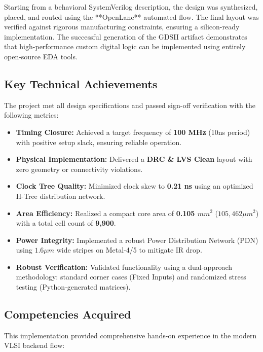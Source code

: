 \documentclass[12pt,a4paper]{article}
\begin{document}
Starting from a behavioral SystemVerilog description, the design was synthesized, placed, and routed using the **OpenLane** automated flow. The final layout was verified against rigorous manufacturing constraints, ensuring a silicon-ready implementation. The successful generation of the GDSII artifact demonstrates that high-performance custom digital logic can be implemented using entirely open-source EDA tools.

\subsection{Key Technical Achievements}

The project met all design specifications and passed sign-off verification with the following metrics:

\begin{itemize}
    \item \textbf{Timing Closure:} Achieved a target frequency of \textbf{100 MHz} (10ns period) with positive setup slack, ensuring reliable operation.
    \item \textbf{Physical Implementation:} Delivered a \textbf{DRC \& LVS Clean} layout with zero geometry or connectivity violations.
    \item \textbf{Clock Tree Quality:} Minimized clock skew to \textbf{0.21 ns} using an optimized H-Tree distribution network.
    \item \textbf{Area Efficiency:} Realized a compact core area of \textbf{0.105 $mm^2$} ($105,462 \mu m^2$) with a total cell count of \textbf{9,900}.
    \item \textbf{Power Integrity:} Implemented a robust Power Distribution Network (PDN) using $1.6 \mu m$ wide stripes on Metal-4/5 to mitigate IR drop.
    \item \textbf{Robust Verification:} Validated functionality using a dual-approach methodology: standard corner cases (Fixed Inputs) and randomized stress testing (Python-generated matrices).
\end{itemize}
\newpage
\subsection{Competencies Acquired}

This implementation provided comprehensive hands-on experience in the modern VLSI backend flow:
\end{document}
